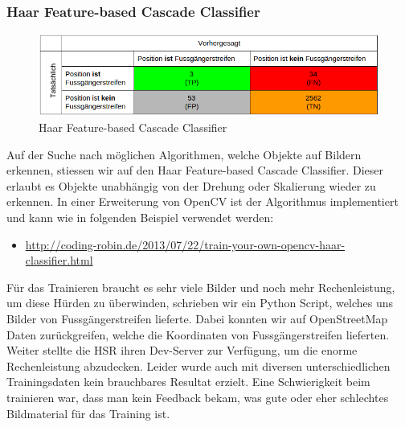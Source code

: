 \subsubsection{Haar Feature-based Cascade Classifier}
\begin{figure}[H]
\includegraphics[width=\textwidth]{images/haar_conf.png}
\caption[Haar Feature-based Cascade Classifier]{Haar Feature-based Cascade Classifier}
\end{figure}
Auf der Suche nach möglichen Algorithmen, welche Objekte auf Bildern erkennen, stiessen wir auf den Haar Feature-based Cascade Classifier. Dieser erlaubt es Objekte unabhängig von der Drehung oder Skalierung wieder zu erkennen. In einer Erweiterung von OpenCV ist der Algorithmus implementiert und kann wie in folgenden Beispiel verwendet werden: 
\begin{itemize}
	\item \url{http://coding-robin.de/2013/07/22/train-your-own-opencv-haar-classifier.html}
\end{itemize}
Für das Trainieren braucht es sehr viele Bilder und noch mehr Rechenleistung, um diese Hürden zu überwinden, schrieben wir ein Python Script, welches uns Bilder von Fussgängerstreifen lieferte. Dabei konnten wir auf OpenStreetMap Daten zurückgreifen, welche die Koordinaten von Fussgängerstreifen lieferten. Weiter stellte die HSR ihren Dev-Server zur Verfügung, um die enorme Rechenleistung abzudecken. Leider wurde auch mit diversen unterschiedlichen Trainingsdaten kein brauchbares Resultat erzielt. Eine Schwierigkeit beim trainieren war, dass man kein Feedback bekam, was gute oder eher schlechtes Bildmaterial für das Training ist.

